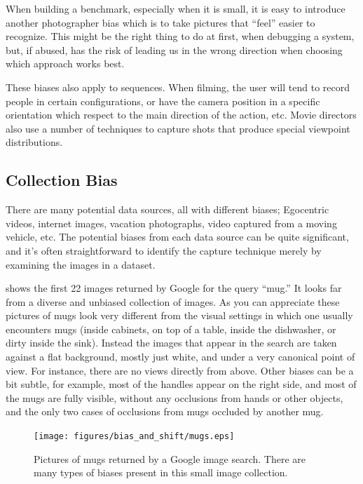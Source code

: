 When building a benchmark, especially when it is small, it is easy to introduce another photographer bias which is to take pictures that ``feel'' easier to recognize. This might be the right thing to do at first, when debugging a system, but, if abused, has the risk of leading us in the wrong direction when choosing which approach works best.  

These biases also apply to sequences. When filming, the user will tend to record people in certain configurations, or have the camera position in a specific orientation which respect to the main direction of the action, etc. Movie directors also use a number of techniques to capture shots that produce special viewpoint distributions. 

\subsection{Collection Bias}

There are many potential data sources, all with different biases; Egocentric videos, internet images, vacation photographs, video captured from a moving vehicle, etc. The potential biases from each data source can be quite significant, and it's often straightforward to identify the capture technique merely by examining the images in a dataset.  

\Fig{\ref{fig:bias_and_shift:mugs}} shows the first 22 images returned by Google for the query ``mug.'' It looks far from a diverse and unbiased collection of images. As you can appreciate these pictures of mugs look very different from the visual settings in which one usually encounters mugs (inside cabinets, on top of a table, inside the dishwasher, or dirty inside the sink). Instead the images that appear in the search are taken against a flat background, mostly just white, and under a very canonical point of view. For instance, there are no views directly from above. Other biases can be a bit subtle, for example, most of the handles appear on the right side, and most of the mugs are fully visible, without any occlusions from hands or other objects, and the only two cases of occlusions from mugs occluded by another mug.


\begin{figure}[t]
    \centerline{
    \texttt{[image: figures/bias\_and\_shift/mugs.eps]}
    }
    \caption{Pictures of mugs returned by a Google image search. There are many types of biases present in this small image collection.}
    \label{fig:bias_and_shift:mugs}
\end{figure}

